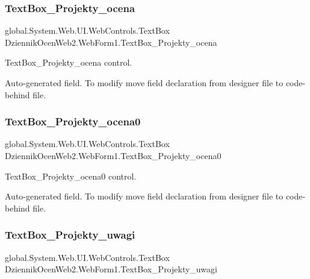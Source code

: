\subsubsection{\texorpdfstring{Text\+Box\+\_\+\+Projekty\+\_\+ocena}{TextBox\_Projekty\_ocena}}
{\footnotesize\ttfamily global.\+System.\+Web.\+U\+I.\+Web\+Controls.\+Text\+Box Dziennik\+Ocen\+Web2.\+Web\+Form1.\+Text\+Box\+\_\+\+Projekty\+\_\+ocena\hspace{0.3cm}{\ttfamily [protected]}}



Text\+Box\+\_\+\+Projekty\+\_\+ocena control. 

Auto-\/generated field. To modify move field declaration from designer file to code-\/behind file. \mbox{\label{class_dziennik_ocen_web2_1_1_web_form1_a5a77cbbbe25b39b4f8a5639be94ac841}} 
\subsubsection{\texorpdfstring{Text\+Box\+\_\+\+Projekty\+\_\+ocena0}{TextBox\_Projekty\_ocena0}}
{\footnotesize\ttfamily global.\+System.\+Web.\+U\+I.\+Web\+Controls.\+Text\+Box Dziennik\+Ocen\+Web2.\+Web\+Form1.\+Text\+Box\+\_\+\+Projekty\+\_\+ocena0\hspace{0.3cm}{\ttfamily [protected]}}



Text\+Box\+\_\+\+Projekty\+\_\+ocena0 control. 

Auto-\/generated field. To modify move field declaration from designer file to code-\/behind file. \mbox{\label{class_dziennik_ocen_web2_1_1_web_form1_a43df52d8c914980d8f9a8b377884aa09}} 
\subsubsection{\texorpdfstring{Text\+Box\+\_\+\+Projekty\+\_\+uwagi}{TextBox\_Projekty\_uwagi}}
{\footnotesize\ttfamily global.\+System.\+Web.\+U\+I.\+Web\+Controls.\+Text\+Box Dziennik\+Ocen\+Web2.\+Web\+Form1.\+Text\+Box\+\_\+\+Projekty\+\_\+uwagi\hspace{0.3cm}{\ttfamily [protected]}}



